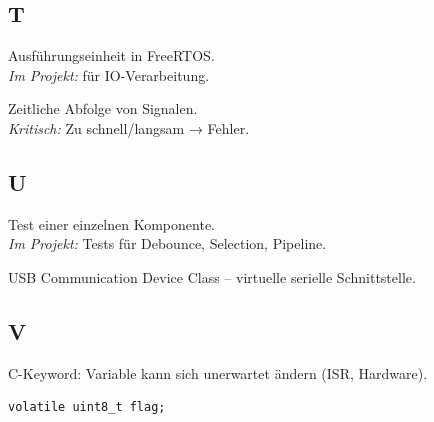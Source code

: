 \subsection*{T}

\begin{description}[style=nextline, leftmargin=2.5cm, labelwidth=2.3cm]

\item[Task]
Ausführungseinheit in FreeRTOS.\\
\textit{Im Projekt:}  für IO-Verarbeitung.

\item[Timing]
Zeitliche Abfolge von Signalen.\\
\textit{Kritisch:} Zu schnell/langsam → Fehler.

\end{description}

\subsection*{U}

\begin{description}[style=nextline, leftmargin=2.5cm, labelwidth=2.3cm]

\item[Unit-Test]
Test einer einzelnen Komponente.\\
\textit{Im Projekt:} Tests für Debounce, Selection, Pipeline.

\item[USB-CDC]
USB Communication Device Class – virtuelle serielle Schnittstelle.

\end{description}

\subsection*{V}

\begin{description}[style=nextline, leftmargin=2.5cm, labelwidth=2.3cm]

\item[Volatile]
C-Keyword: Variable kann sich unerwartet ändern (ISR, Hardware).
\begin{lstlisting}[style=arduino,numbers=none]
volatile uint8_t flag;
\end{lstlisting}

\end{description}

